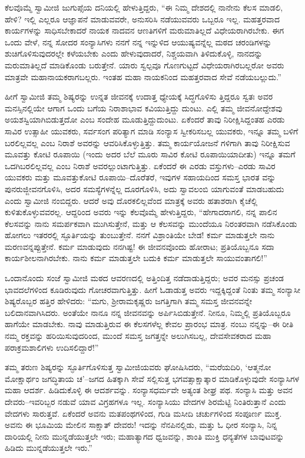 ಕೆಲವೊಮ್ಮೆ ಸ್ವಾಮೀಜಿ ಜುಗುಪ್ಸೆಯ ದನಿಯಲ್ಲಿ ಹೇಳುತ್ತಿದ್ದರು, “ಈ ನಿಮ್ಮ ದೇಶದಲ್ಲಿ ನಾನೇನು ಕೆಲಸ ಮಾಡಲಿ, ಹೇಳಿ? ಇಲ್ಲಿ ಎಲ್ಲರೂ ಆಜ್ಞಾಪನೆ ಮಾಡುವವರೇ, ಅನುಸರಿಸಿ ನಡೆಯುವವರು ಒಬ್ಬರೂ ಇಲ್ಲ. ಮಹತ್ತರವಾದ ಕಾರ್ಯಗಳನ್ನು ಸಾಧಿಸಬೇಕಾದರೆ ನಾಯಕ ನಾದವನ ಆಣತಿಗಳಿಗೆ ಮರುಮಾತಿಲ್ಲದೆ ವಿಧೇಯರಾಗಿರಬೇಕು. ಈಗ ಒಂದು ವೇಳೆ, ನನ್ನ ಸೋದರ ಸಂನ್ಯಾಸಿಗಳು ನನಗೆ ನನ್ನ ಇನ್ನುಳಿದ ಆಯುಷ್ಯವನ್ನೆಲ್ಲ ಮಠದ ಚರಂಡಿಗಳನ್ನು ಶುಚಿಗೊಳಿಸುವುದರಲ್ಲೇ ಕಳೆಯಬೇಕು ಎಂದು ಹೇಳುವುದಾದರೆ, ನಿಶ್ಚಯವಾಗಿ ತಿಳಿದುಕೊಳ್ಳಿ, ನಾನದನ್ನು ಮರುಮಾತಿಲ್ಲದೆ ಮಾಡಿಕೊಂಡು ಬರುತ್ತೇನೆ. ಯಾರು ಸ್ವಲ್ಪವೂ ಗೊಣಗುಟ್ಟದೆ ವಿಧೇಯರಾಗಿರಬಲ್ಲರೋ ಅವರು ಮಾತ್ರವೇ ಮಹಾನಾಯಕರಾಗಬಲ್ಲರು. ಇಂತಹ ಮಹಾ ನಾಯಕನಿಂದ ಮಹತ್ತರವಾದ ಸೇವೆ ನಡೆಯಬಲ್ಲುದು.”

ಹೀಗೆ ಸ್ವಾಮೀಜಿ ತಮ್ಮ ಶಿಷ್ಯರನ್ನು ಉನ್ನತ ಜೀವನಕ್ಕೆ ಉದಾತ್ತ ಧ್ಯೇಯಕ್ಕೆ ಸಿದ್ಧಗೊಳಿಸು ತ್ತಿದ್ದರೂ ಸ್ವತಃ ಅವರ ಮನಸ್ಸಿನಲ್ಲಿಯೇ ಆಗಾಗ ಒಂದು ಬಗೆಯ ನಿರಾಶಾಭಾವ ಕವಿಯುತ್ತಿದ್ದು ದುಂಟು. ಎಲ್ಲಿ ತಮ್ಮ ಜೀವನೋದ್ದೇಶವು ಅಯಶಸ್ವಿಯಾಗಿಬಿಡುತ್ತದೋ ಎಂಬ ಸಂದೇಹ ಮೂಡುತ್ತಿದ್ದುದುಂಟು. ಏಕೆಂದರೆ ತಾವು ನಿರೀಕ್ಷಿಸಿದ್ದಂತಹ ಎರಡು ಸಾವಿರ ಉತ್ಸಾಹೀ ಯುವಕರು, ಸರ್ವಸಂಗ ಪರಿತ್ಯಾಗ ಮಾಡಿ ಸಂನ್ಯಾಸ ಸ್ವೀಕರಿಸಬಲ್ಲ ಯುವಕರು, ಇನ್ನೂ ತಮ್ಮ ಬಳಿಗೆ ಬರಲಿಲ್ಲವಲ್ಲ ಎಂಬ ನಿರಾಶೆ ಅವರನ್ನು ಆವರಿಸಿಕೊಳ್ಳುತ್ತಿತ್ತು. ತಮ್ಮ ಕಾರ್ಯಯೋಜನೆ ಗಳಿಗಾಗಿ ತಾವು ನಿರೀಕ್ಷಿಸುವ ಮೂವತ್ತು ಕೋಟಿ ರೂಪಾಯಿ (ಇಂದು ಅದರ ಬೆಲೆ ಮೂರು ಸಾವಿರ ಕೋಟಿ ರೂಪಾಯಿಯಾದೀತು) ಇನ್ನೂ ತಮಗೆ ಒದಗಿಬರಲಿಲ್ಲವಲ್ಲ ಎಂಬ ನಿರಾಶೆ ಅವರಲ್ಲುಂಟಾಗುತ್ತಿತ್ತು. ಏಕೆಂದರೆ ಈ ಎರಡು ವಸ್ತುಗಳು–ಎರಡು ಸಾವಿರ ಯುವಕರು ಮತ್ತು ಮೂವತ್ತುಕೋಟಿ ರೂಪಾಯಿ–ದೊರೆತರೆ, ಇವುಗಳ ಸಹಾಯದಿಂದ ಸಮಸ್ತ ಭಾರತ ವನ್ನು ಪುನರುಜ್ಜೀವನಗೊಳಿಸಿ, ಅದರ ಸಮಸ್ಯೆಗಳನ್ನೆಲ್ಲ ದೂರಗೊಳಿಸಿ, ಅದು ಸ್ವಾವಲಂಬಿ ಯಾಗುವಂತೆ ಮಾಡಬಹುದು ಎಂದು ಸ್ವಾಮೀಜಿ ನಂಬಿದ್ದರು. ಆದರೆ ಅವು ದೊರಕಲಿಲ್ಲವೆಂದ ಮಾತ್ರಕ್ಕೆ ಅವರು ಹತಾಶರಾಗಿ ಕೈಚೆಲ್ಲಿ ಕುಳಿತುಕೊಳ್ಳುವವರಲ್ಲ. ಆದ್ದರಿಂದ ಅವರು ಇನ್ನು ಕೆಲವೊಮ್ಮೆ ಹೇಳುತ್ತಿದ್ದರು, “ಹೇಗಾದರಾಗಲಿ, ನನ್ನ ಪಾಲಿನ ಕೆಲಸವನ್ನು ನಾನು ಸಮರ್ಪಕವಾಗಿ ಮುಗಿಸುತ್ತೇನೆ, ಮತ್ತು ಆ ಕೆಲಸವನ್ನು ಮುಂದೆಯೂ ನಿರಂತರವಾಗಿ ನಡೆಸಿಕೊಂಡು ಹೋಗಲು ಇತರರಲ್ಲಿ ಸ್ಫೂರ್ತಿಯನ್ನು ತುಂಬುತ್ತೇನೆ. ನನಗೆ ವಿಶ್ರಾಂತಿಯೇ ಬೇಡ! ಕರ್ಮ ಮಾಡುತ್ತಲೇ ನಾನು ಮರಣವನ್ನಪ್ಪುತ್ತೇನೆ. ಕರ್ಮ ಮಾಡುವುದು ನನಗಿಷ್ಟ! ಈ ಜೀವನವೊಂದು ಹೋರಾಟ; ಪ್ರತಿಯೊಬ್ಬನೂ ಸದಾ ಕಾರ್ಯಶೀಲನಾಗಿರಬೇಕು. ನಾನು ಕರ್ಮ ಮಾಡುತ್ತಲೇ ಬದುಕಿ ಕರ್ಮ ಮಾಡುತ್ತಲೇ ಸಾಯುವಂತಾಗಲಿ!”

ಒಂದಾನೊಂದು ಸಂಜೆ ಸ್ವಾಮೀಜಿ ಮಠದ ಆವರಣದಲ್ಲಿ ಅತ್ತಿಂದಿತ್ತ ನಡೆದಾಡುತ್ತಿದ್ದರು; ಅವರ ಮನಸ್ಸು ಪ್ರಚಂಡ ಭಾವದಲೆಗಳಿಂದ ಕೂಡಿರುವುದು ಗೋಚರವಾಗುತ್ತಿತ್ತು. ಹೀಗೆ ಓಡಾಡುತ್ತ ಅವರು ಇದ್ದಕ್ಕಿದ್ದಂತೆ ನಿಂತು ತಮ್ಮ ಸಂನ್ಯಾಸೀ ಶಿಷ್ಯರೊಬ್ಬರ ಹತ್ತಿರ ಹೇಳಿದರು: “ಮಗು, ಶ್ರೀರಾಮಕೃಷ್ಣರು ಜಗತ್ತಿಗಾಗಿ ತಮ್ಮ ಸಮಸ್ತ ಜೀವನವನ್ನೇ ಬಲಿದಾನವಾಗಿಸಿದರು. ಅಂತೆಯೇ ನಾನೂ ನನ್ನ ಜೀವನವನ್ನು ಅರ್ಪಿಸಿಬಿಡುತ್ತೇನೆ. ನೀನೂ, ನಿಮ್ಮಲ್ಲಿ ಪ್ರತಿಯೊಬ್ಬರೂ ಹಾಗೆಯೇ ಮಾಡಬೇಕು. ನಾವು ಮಾಡುತ್ತಿರುವ ಈ ಕೆಲಸಗಳೆಲ್ಲ ಕೇವಲ ಪ್ರಾರಂಭ ಮಾತ್ರ. ನಂಬು ನನ್ನನ್ನು–ಈ ರೀತಿ ನಮ್ಮ ರಕ್ತವನ್ನು ಹರಿಯಿಸುವುದರಿಂದ, ಮುಂದೆ ಸಮಸ್ತ ಜಗತ್ತನ್ನೇ ಅಲುಗಿಸಬಲ್ಲ, ದೇವಸೇವಕರಾದ ಮಹಾ ಪರಾಕ್ರಮಶಾಲಿಗಳು ಉದಿಸಲಿದ್ದಾರೆ!”

ತಮ್ಮ ತರುಣ ಶಿಷ್ಯರನ್ನು ಸ್ಫೂರ್ತಿಗೊಳಿಸುತ್ತ ಸ್ವಾಮೀಜಿಯವರು ಘೋಷಿಸಿದರು, “ಮರೆಯದಿರಿ, ‘ಆತ್ಮನೋ ಮೋಕ್ಷಾರ್ಥಂ ಜಗದ್ಧಿತಾಯ ಚ’–ಜಗದ ಹಿತಕ್ಕಾಗಿ ಸೇವೆ ಸಲ್ಲಿಸುತ್ತ ಭಗವತ್ಸಾಕ್ಷಾತ್ಕಾರ ಮಾಡಿಕೊಳ್ಳುವುದೇ ಸಂನ್ಯಾಸಿಗಳ ಮಹಾ ಆದರ್ಶ. ಹಿಡಿದುಕೊಳ್ಳಿ ಈ ಆದರ್ಶವನ್ನು. ಸಂನ್ಯಾಸಧರ್ಮವೇ ಅತ್ಯಂತ ಶೀಘ್ರ ಪಥ. ಸಂನ್ಯಾಸಿ ಮತ್ತು ಅವನ ದೇವರು–ಇವರಿಬ್ಬರ ನಡುವೆ ಯಾವ ವಿಗ್ರಹಗಳೂ ಇಲ್ಲ. ಸಂನ್ಯಾಸಿಯು ವೇದಗಳ ಶಿರಮೆಟ್ಟಿ ನಿಂತಿರುತ್ತಾನೆ ಎಂದು ವೇದಗಳು ಸಾರುತ್ತವೆ. ಏಕೆಂದರೆ ಅವನು ಮತಪಂಥಗಳಿಂದ, ಗುಡಿ ಮಸೀದಿ ಚರ್ಚುಗಳಿಂದ ಸಂಪೂರ್ಣ ಮುಕ್ತ. ಅವನು ಈ ಭೂಮಿಯ ಮೇಲಿನ ಸಾಕ್ಷಾತ್ ದೇವರು! ಇದನ್ನು ನೆನಪಿನಲ್ಲಿಡು, ಮತ್ತು ಓ ಧೀರ ಸಂನ್ಯಾಸಿ, ನಿನ್ನ ದಾರಿಯಲ್ಲಿ ನೀನು ಮುನ್ನಡೆಯುತ್ತಲೇ ಇರು; ಮಹಾತ್ಯಾಗದ ಧ್ವಜವನ್ನು, ಶಾಂತಿ ಮುಕ್ತಿ ಧನ್ಯತೆಗಳ ಬಾವುಟವನ್ನು ಹಿಡಿದು ಮುನ್ನಡೆಯುತ್ತಲೇ ಇರು.”

